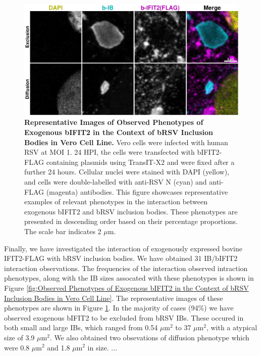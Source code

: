 \begin{figure}
    \centering
    \includegraphics[width=1\linewidth]{09. Chapter 4/Figs/02. Overexpression/02. IFIT2/09. bi2f-brsv.pdf}
    \caption[Representative Images of Observed Phenotypes of Exogenous bIFIT2 in the Context of bRSV Inclusion Bodies in Vero Cell Line.]{\textbf{Representative Images of Observed Phenotypes of Exogenous bIFIT2 in the Context of bRSV Inclusion Bodies in Vero Cell Line.} Vero cells were infected with human RSV at MOI 1. 24 HPI, the cells were transfected with bIFIT2-FLAG containing plasmids using TransIT-X2 and were fixed after a further 24 hours. Cellular nuclei were stained with DAPI (yellow), and cells were double-labelled with anti-RSV N (cyan) and anti-FLAG (magenta) antibodies. This figure showcases representative examples of relevant phenotypes in the interaction between exogenous bIFIT2 and bRSV inclusion bodies. These phenotypes are presented in descending order based on their percentage proportions. The scale bar indicates 2 \(\mu \mbox{m}\).}
    \label{fig:Representative Images of Observed Phenotypes of Exogenous bIFIT2 in the Context of bRSV Inclusion Bodies in Vero Cell Line}
\end{figure}

Finally, we have investigated the interaction of exogenously expressed bovine IFIT2-FLAG with bRSV inclusion bodies. We have obtained 31 IB/bIFIT2 interaction observations. The frequencies of the interaction observed intraction phenotypes, along with the IB sizes assocated with these phenotypes is shown in Figure \ref{fig:Observed Phenotypes of Exogenous bIFIT2 in the Context of bRSV Inclusion Bodies in Vero Cell Line}. The representative images of these phenotypes are shown in Figure \ref{fig:Representative Images of Observed Phenotypes of Exogenous bIFIT2 in the Context of bRSV Inclusion Bodies in Vero Cell Line}. In the majority of cases (94\%) we have observed exogenous bIFIT2 to be excluded from bRSV IBs. These occured in both small and large IBs, which ranged from 0.54 \(\mu \mbox{m}^2\) to 37 \(\mu \mbox{m}^2\), with a atypical size of 3.9 \(\mu \mbox{m}^2\). We also obtained two obsevations of diffusion phenotype which were 0.8 \(\mu \mbox{m}^2\) and 1.8 \(\mu \mbox{m}^2\) in size. ...

